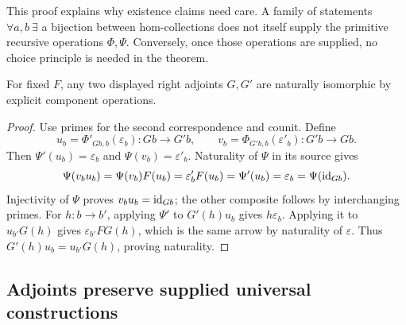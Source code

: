 This proof explains why existence claims need care.  A family of statements
$\forall a,b\ \exists$ a bijection between hom-collections does not itself
supply the primitive recursive operations $\Phi,\Psi$.  Conversely, once
those operations are supplied, no choice principle is needed in the theorem.

\begin{proposition}
For fixed $F$, any two displayed right adjoints $G,G'$ are naturally
isomorphic by explicit component operations.
\end{proposition}
\begin{proof}
Use primes for the second correspondence and counit.  Define
\[
 u_b=\Phi'_{Gb,b}(\varepsilon_b):Gb\to G'b,
 \qquad
 v_b=\Phi_{G'b,b}(\varepsilon'_b):G'b\to Gb.
\]
Then $\Psi'(u_b)=\varepsilon_b$ and $\Psi(v_b)=\varepsilon'_b$.
Naturality of $\Psi$ in its source gives
\[
 \Psi(v_bu_b)=\Psi(v_b)F(u_b)
 =\varepsilon'_bF(u_b)=\Psi'(u_b)=\varepsilon_b
 =\Psi(\operatorname{id}_{Gb}).
\]
Injectivity of $\Psi$ proves $v_bu_b=\operatorname{id}_{Gb}$; the other composite follows
by interchanging primes.  For $h:b\to b'$, applying $\Psi'$ to
$G'(h)u_b$ gives $h\varepsilon_b$.  Applying it to $u_{b'}G(h)$ gives
$\varepsilon_{b'}FG(h)$, which is the same arrow by naturality of
$\varepsilon$.  Thus $G'(h)u_b=u_{b'}G(h)$, proving naturality.
\end{proof}

\subsection{Adjoints preserve supplied universal constructions}

